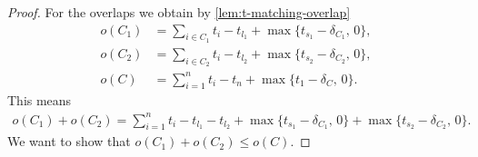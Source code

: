\documentclass[11pt,a4paper]{article}
\theoremstyle{definition}
\theoremstyle{remark}
\begin{document}
\begin{proof}
	For the overlaps we obtain by \cref{lem:t-matching-overlap}
	\begin{align*}
		o(C_1) &= \sum_{i \in C_1} t_i - t_{l_1} + \max\{t_{s_1} - \delta_{C_1},\, 0 \}, \\
		o(C_2) &= \sum_{i \in C_2} t_i - t_{l_2} + \max\{t_{s_2} - \delta_{C_2},\, 0 \}, \\
		o(C) &= \sum_{i=1}^n t_i - t_n + \max\{t_1 - \delta_{C},\, 0 \}.
	\end{align*}
	This means
	\begin{align*}
		o(C_1) + o(C_2) = \sum_{i=1}^n t_i - t_{l_1} - t_{l_2} + \max\{t_{s_1} - \delta_{C_1},\, 0 \} + \max\{t_{s_2} - \delta_{C_2},\, 0 \}.
	\end{align*}
	We want to show that $o(C_1) + o(C_2) \leq o(C)$.
	

\end{proof}
\end{document}
